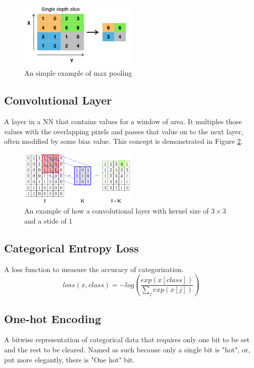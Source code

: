 \documentclass[10pt,Times New Roman]{article}
\begin{document}
        \begin{figure}[h] 
            \centering \includegraphics[width=0.5\textwidth]{max_pooling_example}
            \caption{An simple example of max pooling}\label{fig:maxpool}
        \end{figure}

    \subsection{Convolutional Layer}
        A layer in a NN that contains values for a window of area. It multiples those values
        with the overlapping pixels and passes that value on to the next layer, often modified
        by some bias value. This concept is demonstrated in Figure \ref{fig:convlayer}.

        \begin{figure}[h]
            \centering \includegraphics[width=0.5\textwidth]{convolutional_layer_example}
            \caption{An example of how a convolutional layer with kernel size of $3\times3$ and a
                     stide of 1}\label{fig:convlayer}
        \end{figure}

    \subsection{Categorical Entropy Loss}\label{def:catentropyloss}
        A loss function to measure the accuracy of categorization.
        \[loss(x, class) = -log\left(\frac{exp(x[class])}{\sum_j exp(x[j])}\right)\]

    \subsection{One-hot Encoding}
        A bitwise representation of categorical data that requires only one bit to be set and 
        the rest to be cleared. Named as such because only a single bit is "hot", or, put more 
        elegantly, there is "One hot" bit.
\end{document}
